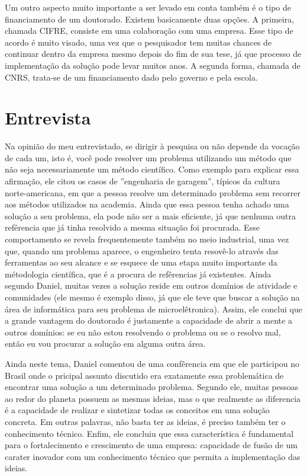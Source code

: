 \documentclass{article}
\begin{document}
\vspace{12pt}

Um outro aspecto muito importante a ser levado em conta também é o tipo de
financiamento de um doutorado. Existem basicamente duas opções. A primeira,
chamada CIFRE, consiste em uma colaboração com uma empresa. Esse tipo de acordo
é muito visado, uma vez que o pesquisador tem muitas chances de continuar dentro
da empresa mesmo depois do fim de sua tese, já que processo de implementação da
solução pode levar muitos anos. A segunda forma, chamada de CNRS, trata-se de um
financiamento dado pelo governo e pela escola.

\newpage

\section{Entrevista}

Na opinião do meu entrevistado, se dirigir à pesquisa ou não depende da vocação
de cada um, isto é, você pode resolver um problema utilizando um método que não
seja necessariamente um método científico. Como exemplo para explicar essa
afirmação, ele citou os casos de ''engenharia de garagem'', típicos da cultura
norte-americana, em que a pessoa resolve um determinado problema sem recorrer
aos métodos utilizados na academia. Ainda que essa pessoa tenha achado uma
solução a seu problema, ela pode não ser a mais eficiente, já que nenhuma outra 
refêrencia que já tinha resolvido a mesma situação foi procurada. Esse
comportamento se revela frequentemente também no meio industrial, uma vez que,
quando um problema aparece, o engenheiro tenta resovê-lo através das
ferramentas ao seu alcance e se esquece de uma etapa muito importante da
métodologia científica, que é a procura de refêrencias já existentes. Ainda
segundo Daniel, muitas vezes a solução reside em outros domínios de
atividade e comunidades (ele mesmo é exemplo disso, já que ele teve que buscar
a solução na área de informática para seu problema de microelêtronica). Assim,
ele conclui que a grande vantagem do doutorado é justamente a capacidade de
abrir a mente a outros domínios: se eu não estou resolvendo o problema ou se o
resolvo mal, então eu vou procurar a solução em alguma outra área.

\vspace{12pt}

Ainda neste tema, Daniel comentou de uma confêrencia em que ele participou
no Brasil onde o pricipal assunto discutido era exatamente essa problemática de
encontrar uma solução a um determinado problema. Segundo ele, muitas pessoas ao
redor do planeta possuem as mesmas ideias, mas o que realmente as diferencia é a
capacidade de realizar e sintetizar todas os conceitos em uma solução concreta.
Em outras palavras, não basta ter as ideias, é preciso também ter o conhecimento
técnico. Enfim, ele concluiu que essa característica é fundamental para o
fortalecimento e crescimento de uma empresa: capacidade de fusão de um carater
inovador com um conhecimento técnico que permita a implementação das ideias.
\end{document}
